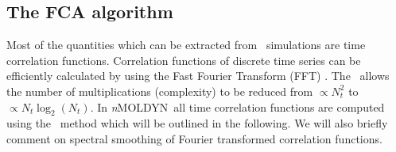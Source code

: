 \documentclass[a4paper,11pt]{report}
\newcommand{\NMOLDYN}{\textit{n}MOLDYN}
\begin{document}
\newpage
\appendix
\appendixpage
\addappheadtotoc
\begin{appendices}
\chapter{The FCA algorithm}
\label{fca}
Most of the quantities which can be extracted from \MD\ simulations are time correlation functions. 
Correlation functions of discrete time series can be efficiently calculated by using the Fast Fourier 
Transform (FFT) \cite{Brigham}. The \FCA\ allows the number of multiplications (complexity) to be reduced from $\propto N_t^2$ to $\propto N_t \log_2(N_t)$. In 
\NMOLDYN\ all time correlation functions are computed using the \FCA\ method which will be outlined in the 
following. We will also briefly comment on spectral smoothing of Fourier transformed correlation functions.


\end{appendices}
\end{document}

